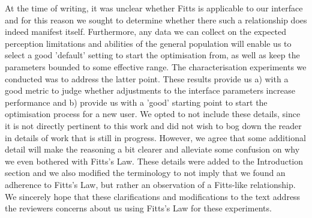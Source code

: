 \documentclass{scrartcl}
\begin{document}
\begin{itemize}
  At the time of writing, it was unclear whether Fitts is applicable to our interface and for this reason we sought to determine whether there such a relationship does indeed manifest itself.
  Furthermore, any data we can collect on the expected perception limitations and abilities of the general population will enable us to select a good 'default' setting to start the optimisation from, as well as keep the parameters bounded to some effective range.
  The characterisation experiments we conducted was to address the latter point.
  These results provide us a) with a good metric to judge whether adjustments to the interface parameters increase performance and b) provide us with a 'good' starting point to start the optimisation process for a new user.
  We opted to not include these details, since it is not directly pertinent to this work and did not wish to bog down the reader in details of work that is still in progress.
  However, we agree that some additional detail will make the reasoning a bit clearer and alleviate some confusion on why we even bothered with Fitts's Law.
  These details were added to the Introduction section and we also modified the terminology to not imply that we found an adherence to Fitts's Law, but rather an observation of a Fitts-like relationship.
  We sincerely hope that these clarifications and modifications to the text address the reviewers concerns about us using Fitts's Law for these experiments. 


\end{itemize}
\end{document}

